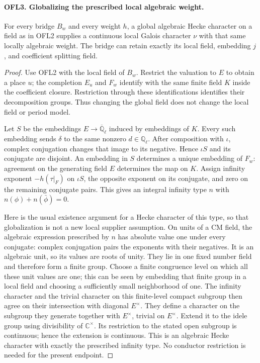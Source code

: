 \documentclass[11pt,a4paper]{article}
\numberwithin{equation}{section}
\theoremstyle{remark}\newtheorem{remark}[theorem]{Remark}
\begin{document}
\paragraph{OFL3. Globalizing the prescribed local algebraic weight.}
\label{claim:OFL3}
For every bridge \(B_w\) and every weight \(h\), a global
algebraic Hecke character on a field as in OFL2 supplies a continuous
local Galois character \(\nu\) with that same locally algebraic
weight.  The bridge can retain exactly its local field, embedding
\(j\), and coefficient splitting field.
\begin{proof}
Use OFL2 with the local field of \(B_w\).  Restrict the valuation
to \(E\) to obtain a place \(u\); the completion \(E_u\)
and \(F_w\) identify with the same finite field \(K\) inside
the coefficient closure.  Restriction through these identifications
identifies their decomposition groups.  Thus changing the global
field does not change the local field or period model.

Let \(S\) be the embeddings \(E\to\overline{\mathbb Q}_\ell\)
induced by embeddings of \(K\).  Every such embedding sends
\(\delta\) to the same nonzero \(d\in\mathbb Q_\ell\).
After composition with \(\iota\), complex conjugation changes
that image to its negative.  Hence \(\iota S\) and its conjugate
are disjoint.  An embedding in \(S\) determines a unique embedding
of \(F_w\): agreement on the generating field \(E\) determines
the map on \(K\).  Assign infinity exponent \(-h(\tau|_F)\)
on \(\iota S\), the opposite exponent on its conjugate, and
zero on the remaining conjugate pairs.  This gives an integral
infinity type \(n\) with \(n(\phi)+n(\bar\phi)=0\).

Here is the usual existence argument for a Hecke character of this
type, so that globalization is not a new local supplier assumption.
On units of a CM field, the algebraic expression prescribed by
\(n\) has absolute value one under every conjugate: complex
conjugation pairs the exponents with their negatives.  It is an
algebraic unit, so its values are roots of unity.  They lie in one
fixed number field and therefore form a finite group.  Choose a
finite congruence level on which all these unit values are one;
this can be seen by embedding that finite group in a local field
and choosing a sufficiently small neighborhood of one.  The
infinity character and the trivial character on this finite-level
compact subgroup then agree on their intersection with diagonal
\(E^\times\).  They define a character on the subgroup they
generate together with \(E^\times\), trivial on \(E^\times\).
Extend it to the idele group using divisibility of \(\mathbb C^\times\).
Its restriction to the stated open subgroup is continuous; hence
the extension is continuous.  This is an algebraic Hecke character
with exactly the prescribed infinity type.  No conductor restriction
is needed for the present endpoint.


\end{proof}
\end{document}
